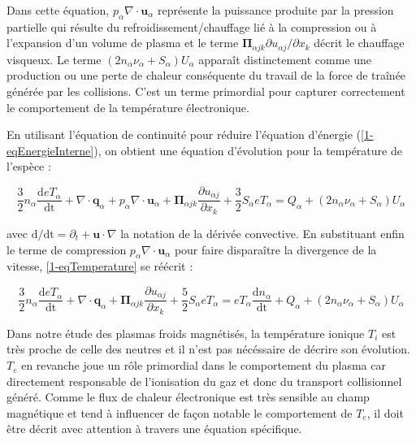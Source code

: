 \begin{refsection}
Dans cette équation, $p_\alpha\nabla\cdot\mathbf u_\alpha$ représente la
puissance produite par la pression partielle qui résulte du
refroidissement/chauffage lié à la compression ou à l'expansion d'un volume de
plasma et le terme $\boldsymbol{\Pi}_{\alpha j k}\partial u_{\alpha
j}/\partial{x_k}$ décrit le chauffage visqueux. Le terme
$(2n_\alpha\nu_\alpha+S_\alpha)U_\alpha$ apparaît distinctement comme une
production ou une perte de chaleur conséquente du travail de la force de traînée générée par
les collisions. C'est un terme primordial pour capturer correctement le
comportement de la température électronique. 

En utilisant l'équation de
continuité pour réduire l'équation d'énergie (\eqref{1-eqEnergieInterne}), on
obtient une équation d'évolution pour la température de l'espèce :

\begin{equation}
\label{1-eqTemperature}
\frac{3}{2}n_\alpha\frac{\text{d}eT_\alpha}{\text{dt}}+\nabla\cdot\mathbf
q_\alpha + p_\alpha\nabla\cdot\mathbf u_\alpha +\boldsymbol{\Pi}_{\alpha j
k}\frac{\partial u_{\alpha j}}{\partial{x_k}}+ \frac{3}{2}S_\alpha eT_\alpha =
{Q_\alpha}+(2n_\alpha\nu_\alpha+S_\alpha)U_\alpha
\end{equation}

avec $\text{d}/\text{dt}=\partial_t+\mathbf u\cdot\nabla$ la notation de
la dérivée convective. En substituant enfin le terme de compression
$p_\alpha\nabla\cdot\mathbf u_\alpha$ pour faire disparaître la divergence de la vitesse,
\eqref{1-eqTemperature} se réécrit :

\begin{equation}
\label{1-eqTemperature2}
\frac{3}{2}n_\alpha\frac{\text{d}eT_\alpha}{\text{dt}}+\nabla\cdot\mathbf
q_\alpha +\boldsymbol{\Pi}_{\alpha j k}\frac{\partial u_{\alpha
j}}{\partial{x_k}}+ \frac{5}{2}S_\alpha eT_\alpha = eT_\alpha\frac{\text{d}n_\alpha}{\text{dt}}+ 
{Q_\alpha}+(2n_\alpha\nu_\alpha+S_\alpha)U_\alpha
\end{equation}

Dans notre étude des plasmas froids magnétisés, la température ionique $T_i$
est très proche de celle des neutres et il n'est pas nécéssaire de décrire
son évolution. $T_e$ en revanche joue un rôle primordial dans le comportement
du plasma car directement responsable de l'ionisation du gaz et donc du
transport collisionnel généré. Comme le flux de chaleur électronique est très
sensible au champ magnétique et tend à influencer de façon notable le
comportement de $T_e$, il doit être décrit avec attention à travers une équation
spécifique.


\end{refsection}
